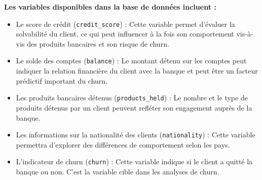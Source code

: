 \documentclass{article}
\begin{document}
\textbf{Les variables disponibles dans la base de données incluent :} 
\begin{itemize}
    \item Le score de crédit (\texttt{credit\_score}) : Cette variable permet d'évaluer la solvabilité du client, ce qui peut influencer à la fois son comportement vis-à-vis des produits bancaires et son risque de churn.
    \item Le solde des comptes (\texttt{balance}) : Le montant détenu sur les comptes peut indiquer la relation financière du client avec la banque et peut être un facteur prédictif important du churn.
    \item Les produits bancaires détenus (\texttt{products\_held}) : Le nombre et le type de produits détenus par un client peuvent refléter son engagement auprès de la banque.
    \item Les informations sur la nationalité des clients (\texttt{nationality}) : Cette variable permettra d'explorer des différences de comportement selon les pays.
    \item L'indicateur de churn (\texttt{churn}) : Cette variable indique si le client a quitté la banque ou non. C’est la variable cible dans les analyses de churn.
\end{itemize}











\end{document}
